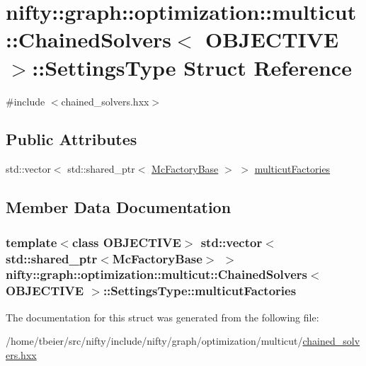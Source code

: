\hypertarget{structnifty_1_1graph_1_1optimization_1_1multicut_1_1ChainedSolvers_1_1SettingsType}{}\section{nifty\+:\+:graph\+:\+:optimization\+:\+:multicut\+:\+:Chained\+Solvers$<$ O\+B\+J\+E\+C\+T\+I\+V\+E $>$\+:\+:Settings\+Type Struct Reference}
\label{structnifty_1_1graph_1_1optimization_1_1multicut_1_1ChainedSolvers_1_1SettingsType}


{\ttfamily \#include $<$chained\+\_\+solvers.\+hxx$>$}

\subsection*{Public Attributes}
\begin{DoxyCompactItemize}
\item 
std\+::vector$<$ std\+::shared\+\_\+ptr$<$ \hyperlink{classnifty_1_1graph_1_1optimization_1_1multicut_1_1ChainedSolvers_ae2a63d54e80124540754a948c9736a72}{Mc\+Factory\+Base} $>$ $>$ \hyperlink{structnifty_1_1graph_1_1optimization_1_1multicut_1_1ChainedSolvers_1_1SettingsType_a9863609e1bad62c856713be22ee51003}{multicut\+Factories}
\end{DoxyCompactItemize}


\subsection{Member Data Documentation}
\hypertarget{structnifty_1_1graph_1_1optimization_1_1multicut_1_1ChainedSolvers_1_1SettingsType_a9863609e1bad62c856713be22ee51003}{}
\subsubsection[{multicut\+Factories}]{\setlength{\rightskip}{0pt plus 5cm}template$<$class O\+B\+J\+E\+C\+T\+I\+V\+E$>$ std\+::vector$<$ std\+::shared\+\_\+ptr$<${\bf Mc\+Factory\+Base}$>$ $>$ {\bf nifty\+::graph\+::optimization\+::multicut\+::\+Chained\+Solvers}$<$ O\+B\+J\+E\+C\+T\+I\+V\+E $>$\+::Settings\+Type\+::multicut\+Factories}\label{structnifty_1_1graph_1_1optimization_1_1multicut_1_1ChainedSolvers_1_1SettingsType_a9863609e1bad62c856713be22ee51003}


The documentation for this struct was generated from the following file\+:\begin{DoxyCompactItemize}
\item 
/home/tbeier/src/nifty/include/nifty/graph/optimization/multicut/\hyperlink{chained__solvers_8hxx}{chained\+\_\+solvers.\+hxx}\end{DoxyCompactItemize}
